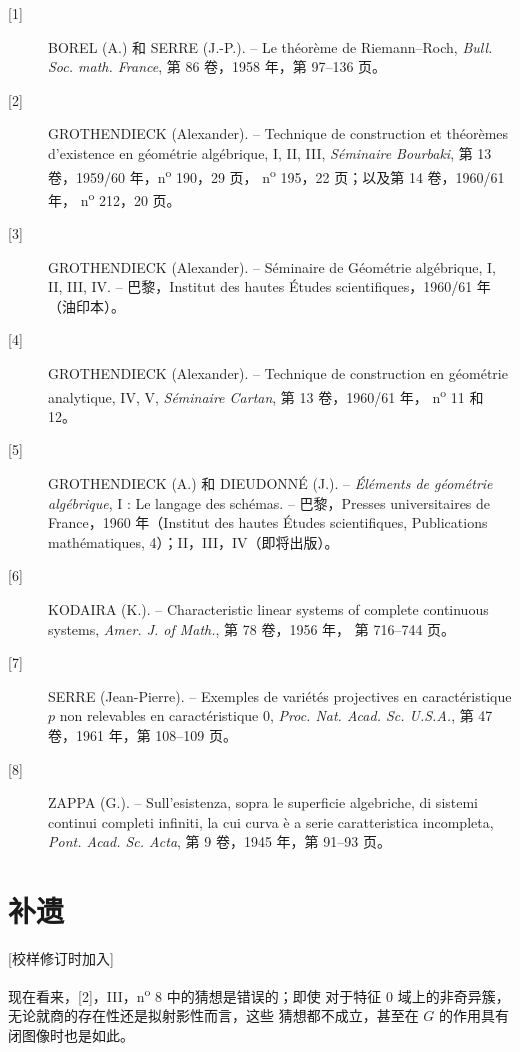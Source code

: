 \begin{description}
\item[{[1]}] BOREL (A.) 和 SERRE (J.-P.). -- Le théorème de Riemann--Roch,
\emph{Bull. Soc. math. France}, 第 86 卷，1958 年，第 97--136 页。

\item[{[2]}] GROTHENDIECK (Alexander). -- Technique de construction et
théorèmes d'existence en géométrie algébrique, I, II, III, \emph{Séminaire
Bourbaki}, 第 13 卷，1959/60 年，n\textsuperscript{o} 190，29 页，
n\textsuperscript{o} 195，22 页；以及第 14 卷，1960/61 年，
n\textsuperscript{o} 212，20 页。

\item[{[3]}] GROTHENDIECK (Alexander). -- Séminaire de Géométrie algébrique,
I, II, III, IV. -- 巴黎，Institut des hautes Études scientifiques，1960/61
年（油印本）。

\item[{[4]}] GROTHENDIECK (Alexander). -- Technique de construction en
géométrie analytique, IV, V, \emph{Séminaire Cartan}, 第 13 卷，1960/61 年，
n\textsuperscript{o} 11 和 12。

\item[{[5]}] GROTHENDIECK (A.) 和 DIEUDONNÉ (J.). -- \emph{Éléments de
géométrie algébrique}, I : Le langage des schémas. -- 巴黎，Presses
universitaires de France，1960 年（Institut des hautes Études scientifiques,
Publications mathématiques, 4）；II，III，IV（即将出版）。

\item[{[6]}] KODAIRA (K.). -- Characteristic linear systems of complete
continuous systems, \emph{Amer. J. of Math.}, 第 78 卷，1956 年，
第 716--744 页。

\item[{[7]}] SERRE (Jean-Pierre). -- Exemples de variétés projectives en
caractéristique $p$ non relevables en caractéristique 0, \emph{Proc. Nat. Acad.
Sc. U.S.A.}, 第 47 卷，1961 年，第 108--109 页。

\item[{[8]}] ZAPPA (G.). -- Sull'esistenza, sopra le superficie algebriche, di
sistemi continui completi infiniti, la cui curva è a serie caratteristica
incompleta, \emph{Pont. Acad. Sc. Acta}, 第 9 卷，1945 年，第 91--93 页。
\end{description}

\section*{补遗}
\begin{center}
{\small [校样修订时加入]}
\end{center}

现在看来，[2]，III，n\textsuperscript{o} 8 中的猜想是错误的；即使
对于特征 0 域上的非奇异簇，无论就商的存在性还是拟射影性而言，这些
猜想都不成立，甚至在 $G$ 的作用具有闭图像时也是如此。

\par
